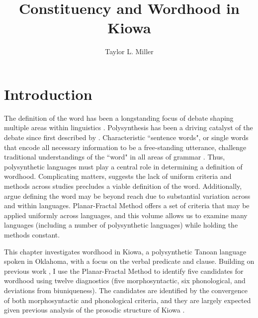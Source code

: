 \documentclass[output=paper]{langscibook}
\author{Taylor L. Miller \affiliation{State University of New York at Oswego}}
\title{Constituency and Wordhood in Kiowa}
\begin{document}
\maketitle

\section{Introduction} \label{sec:kiowaintroduction}

The definition of the word has been a longstanding focus of debate shaping multiple areas within linguistics \citep[e.g.][]{dixon:2002,dixon:2010,bruening:2018}. Polysynthesis has been a driving catalyst of the debate since first described by \citet{duponceau:1819}. Characteristic ``sentence words", or single words that encode all necessary information to be a free-standing utterance, challenge traditional understandings of the ``word" in all areas of grammar \citep[e.g.]{mithun:1983,fortescue:1994,evans:2002}. Thus, polysynthetic languages must play a central role in determining a definition of wordhood. Complicating matters, \citet{haspelmathword:2011} suggests the lack of uniform criteria and methods across studies precludes a viable definition of the word. Additionally, \citet{bickel:2017} argue defining the word may be beyond reach due to substantial variation across and within languages.  Planar-Fractal Method offers a set of criteria that may be applied uniformly across languages, and this volume allows us to examine many languages (including a number of polysynthetic languages) while holding the methods constant. 

This chapter investigates wordhood in Kiowa, a polysynthetic Tanoan language spoken in Oklahoma, with a focus on the verbal predicate and clause. Building on previous work \citep{Miller:2015,Miller:2018,Miller:2020}, I use the Planar-Fractal Method to identify five candidates for wordhood using twelve diagnostics (five morphosyntactic, six phonological, and deviations from biuniqueness). The candidates are identified by the convergence of both morphosyntactic and phonological criteria, and they are largely expected given previous analysis of the prosodic structure of Kiowa \citep{Miller:2015,Miller:2018,Miller:2020}. 
\end{document}
